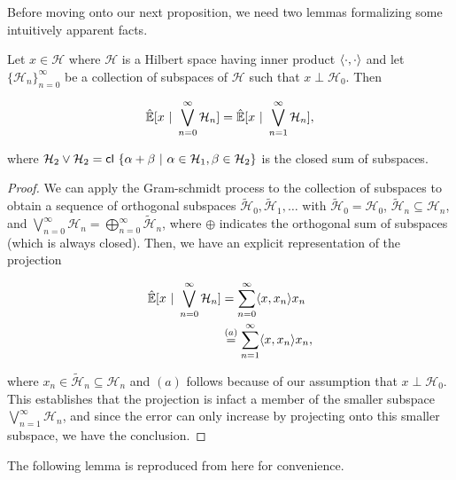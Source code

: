 \documentclass[12pt]{article}
\def\H{\mathcal{H}}  %
\newcommand{\linE}[2]{\hat{\E}[#1\ |\ #2]}  %
\begin{document}
Before moving onto our next proposition, we need two lemmas formalizing
some intuitively apparent facts.

\begin{lemma}
  \label{lem:subspace_sum_projection}
  Let $x \in \H$ where $\H$ is a Hilbert space having inner product $\langle \cdot, \cdot \rangle$ and let $\{\H_n\}_{n = 0}^\infty$ be a collection of subspaces of $\H$ such that $x \perp \H_0$.  Then

  \begin{equation*}
    \linE{x}{\bigvee_{n = 0}^\infty\H_n} = \linE{x}{\bigvee_{n = 1}^\infty\H_n},
  \end{equation*}

  where $\H_2 \vee \H_2 = \cl \{\alpha + \beta\ |\ \alpha \in \H_1, \beta \in \H_2 \}$ is the closed sum of subspaces.
\end{lemma}
\begin{proof}
  We can apply the Gram-schmidt process to the collection of subspaces to obtain a sequence of orthogonal subspaces $\widetilde{\H}_0, \widetilde{\H}_1, \ldots$ with $\widetilde{\H}_0 = \H_0$, $\widetilde{\H}_n \subseteq \H_n$, and $\bigvee_{n = 0}^\infty\H_n = \bigoplus_{n = 0}^\infty \widetilde{\H}_n$, where $\oplus$ indicates the orthogonal sum of subspaces (which is always closed).  Then, we have an explicit representation of the projection

  \begin{align*}
    \linE{x}{\bigvee_{n = 0}^\infty\H_n} &= \sum_{n = 0}^\infty \inner{x}{x_n} x_n\\
    &\overset{(a)}{=} \sum_{n = 1}^\infty \inner{x}{x_n} x_n,
  \end{align*}

  where $x_n \in \widetilde{\H}_n \subseteq \H_n$ and $(a)$ follows because of our assumption that $x \perp \H_0$.  This establishes that the projection is infact a member of the smaller subspace $\bigvee_{n = 1}^\infty\H_n$, and since the error can only increase by projecting onto this smaller subspace, we have the conclusion.
\end{proof}

The following lemma is reproduced from \cite{lindquist} here for convenience.
\end{document}
